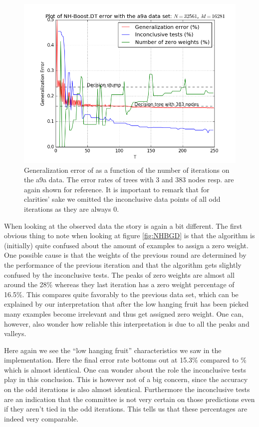 \begin{figure}[!ht]
  \centering
      \includegraphics[width=\graphWidth]{generated/NHSVM.png}
  \caption{Generalization error of \NHB as a function of the number of iterations on the a9a data. The error rates of trees with 3 and 383 nodes resp. are again shown for reference. It is important to remark that for clarities' sake we omitted the inconclusive data points of all odd iterations as they are always 0.}
      \label{fig:NHBSVM}
\end{figure}

\par When looking at the observed data the story is again a bit different. The first obvious thing to note when looking at figure \ref{fig:NHBGD} is that the algorithm is (initially) quite confused about the amount of examples to assign a zero weight. One possible cause is that the weights of the previous round are determined by the performance of the previous iteration and that the algorithm gets slightly confused by the inconclusive tests. The peaks of zero weights are almost all around the 28\% whereas they last iteration has a zero weight percentage of 16.5\%. This compares quite favorably to the previous data set, which can be explained by our interpretation that after the low hanging fruit has been picked many examples become irrelevant and thus get assigned zero weight. One can, however, also wonder how reliable this interpretation is due to all the peaks and valleys. 
\par Here again we see the ``low hanging fruit'' characteristics we saw in the \adaB implementation. Here the final error rate bottoms out at 15.3\% compared to \% which is almost identical. One can wonder about the role the inconclusive tests play in this conclusion. This is however not of a big concern, since the accuracy on the odd iterations is also almost identical. Furthermore the inconclusive tests are an indication that the committee is not very certain on those predictions even if they aren't tied in the odd iterations. This tells us that these percentages are indeed very comparable.  
\FloatBarrier
